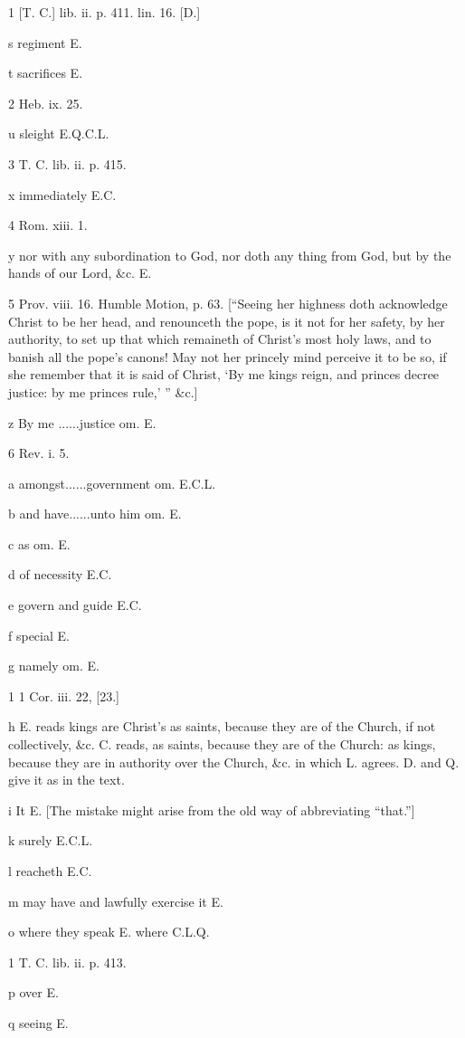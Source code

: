 1
[T. C.] lib. ii. p. 411. lin. 16. [D.]

s
regiment E.

t
sacrifices E.

2
Heb. ix. 25.

u
sleight E.Q.C.L.

3
T. C. lib. ii. p. 415.

x
immediately E.C.

4
Rom. xiii. 1.

y
nor with any subordination to God, nor doth any thing from God, but by the hands of our Lord, &c. E.

5
Prov. viii. 16. Humble Motion, p. 63. [“Seeing her highness doth acknowledge Christ to be her head, and renounceth the pope, is it not for her safety, by her authority, to set up that which remaineth of Christ’s most holy laws, and to banish all the pope’s canons! May not her princely mind perceive it to be so, if she remember that it is said of Christ, ‘By me kings reign, and princes decree justice: by me princes rule,’ ” &c.]

z
By me ......justice om. E.

6
Rev. i. 5.

a
amongst......government om. E.C.L.

b
and have......unto him om. E.

c
as om. E.

d
of necessity E.C.

e
govern and guide E.C.

f
special E.

g
namely om. E.

1
1 Cor. iii. 22, [23.]

h
E. reads kings are Christ’s as saints, because they are of the Church, if not collectively, &c. C. reads, as saints, because they are of the Church: as kings, because they are in authority over the Church, &c. in which L. agrees. D. and Q. give it as in the text.

i
It E. [The mistake might arise from the old way of abbreviating “that.”]

k
surely E.C.L.

l
reacheth E.C.

m
may have and lawfully exercise it E.

o
where they speak E. where C.L.Q.

1
T. C. lib. ii. p. 413.

p
over E.

q
seeing E.

